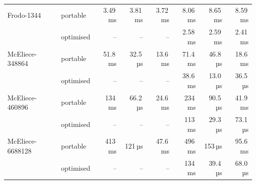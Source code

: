 \begin{tabular}{llrrrrrr}
Frodo-1344 & portable & 3.49\,ms & 3.81\,ms & 3.72\,ms & 8.06\,ms & 8.65\,ms & 8.59\,ms \\
 & optimised & – & – & – & 2.58\,ms & 2.59\,ms & 2.41\,ms \\
\midrule
McEliece-348864 & portable & 51.8\,ms & 32.5\,µs & 13.6\,ms & 71.4\,ms & 46.8\,µs & 18.6\,ms \\
 & optimised & – & – & – & 38.6\,ms & 13.0\,µs & 36.5\,µs \\
McEliece-460896 & portable & 134\,ms & 66.2\,µs & 24.6\,ms & 234\,ms & 90.5\,µs & 41.9\,ms \\
 & optimised & – & – & – & 113\,ms & 29.3\,µs & 73.1\,µs \\
McEliece-6688128 & portable & 413\,ms & 121\,µs & 47.6\,ms & 496\,ms & 153\,µs & 95.6\,ms \\
 & optimised & – & – & – & 134\,ms & 39.4\,µs & 68.0\,µs \\
\bottomrule
\end{tabular}
